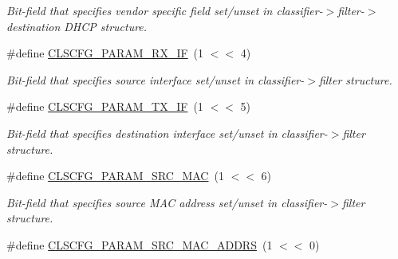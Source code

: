 \begin{DoxyCompactItemize}
\begin{DoxyCompactList}\small\item\em Bit-\/field that specifies vendor specific field set/unset in classifier-\/$>$filter-\/$>$destination D\-H\-C\-P structure. \end{DoxyCompactList}\item 
\hypertarget{group__FAPI__QOS__CLASS_gaa41124ad13d035b5b4a60e2b206d983d}{\#define \hyperlink{group__FAPI__QOS__CLASS_gaa41124ad13d035b5b4a60e2b206d983d}{C\-L\-S\-C\-F\-G\-\_\-\-P\-A\-R\-A\-M\-\_\-\-R\-X\-\_\-\-I\-F}~(1 $<$$<$ 4)}\label{group__FAPI__QOS__CLASS_gaa41124ad13d035b5b4a60e2b206d983d}

\begin{DoxyCompactList}\small\item\em Bit-\/field that specifies source interface set/unset in classifier-\/$>$filter structure. \end{DoxyCompactList}\item 
\hypertarget{group__FAPI__QOS__CLASS_gaa5014aaa57f7bcd2c4a79d91c6f00398}{\#define \hyperlink{group__FAPI__QOS__CLASS_gaa5014aaa57f7bcd2c4a79d91c6f00398}{C\-L\-S\-C\-F\-G\-\_\-\-P\-A\-R\-A\-M\-\_\-\-T\-X\-\_\-\-I\-F}~(1 $<$$<$ 5)}\label{group__FAPI__QOS__CLASS_gaa5014aaa57f7bcd2c4a79d91c6f00398}

\begin{DoxyCompactList}\small\item\em Bit-\/field that specifies destination interface set/unset in classifier-\/$>$filter structure. \end{DoxyCompactList}\item 
\hypertarget{group__FAPI__QOS__CLASS_ga42a1927852fd76fed3ebef06518f0c2b}{\#define \hyperlink{group__FAPI__QOS__CLASS_ga42a1927852fd76fed3ebef06518f0c2b}{C\-L\-S\-C\-F\-G\-\_\-\-P\-A\-R\-A\-M\-\_\-\-S\-R\-C\-\_\-\-M\-A\-C}~(1 $<$$<$ 6)}\label{group__FAPI__QOS__CLASS_ga42a1927852fd76fed3ebef06518f0c2b}

\begin{DoxyCompactList}\small\item\em Bit-\/field that specifies source M\-A\-C address set/unset in classifier-\/$>$filter structure. \end{DoxyCompactList}\item 
\hypertarget{group__FAPI__QOS__CLASS_ga81e277579480cd167a5f612873958a64}{\#define \hyperlink{group__FAPI__QOS__CLASS_ga81e277579480cd167a5f612873958a64}{C\-L\-S\-C\-F\-G\-\_\-\-P\-A\-R\-A\-M\-\_\-\-S\-R\-C\-\_\-\-M\-A\-C\-\_\-\-A\-D\-D\-R\-S}~(1 $<$$<$ 0)}\label{group__FAPI__QOS__CLASS_ga81e277579480cd167a5f612873958a64}


\end{DoxyCompactItemize}
